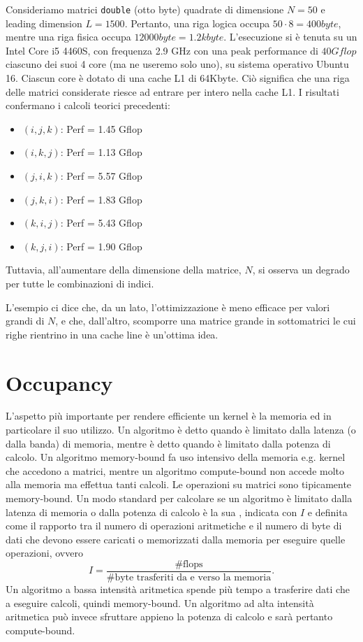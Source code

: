 \begin{example}{}
    Consideriamo matrici \texttt{double} (otto byte) quadrate di dimensione \(N = 50\) e leading dimension \(L = 1500\). 
    Pertanto, una riga logica occupa \(50 \cdot 8 = 400 byte\), mentre una riga fisica occupa \(12000 byte = 1.2 kbyte\).
    L'esecuzione si è tenuta su un Intel Core i5 4460S, con frequenza 2.9 GHz con una peak performance di \(40 Gflop\) ciascuno dei suoi 4 core (ma ne useremo solo uno), su sistema operativo Ubuntu 16.
    Ciascun core è dotato di una cache L1 di 64Kbyte.
    Ciò significa che una riga delle matrici considerate riesce ad entrare per intero nella cache L1.
    I risultati confermano i calcoli teorici precedenti:
    \begin{itemize}
        \item \((i,j,k)\): Perf = 1.45 Gflop
        \item \((i,k,j)\): Perf = 1.13 Gflop
        \item \((j,i,k)\): Perf = 5.57 Gflop
        \item \((j,k,i)\): Perf = 1.83 Gflop
        \item \((k,i,j)\): Perf = 5.43 Gflop
        \item \((k,j,i)\): Perf = 1.90 Gflop
    \end{itemize}
    Tuttavia, all'aumentare della dimensione della matrice, \(N\), si osserva un degrado per tutte le combinazioni di indici.

\end{example}
L'esempio ci dice che, da un lato, l'ottimizzazione è meno efficace per valori grandi di \(N\), e che, dall'altro, scomporre una matrice grande in sottomatrici le cui righe rientrino in una cache line è un'ottima idea.

\section{Occupancy}
L'aspetto più importante per rendere efficiente un kernel è la memoria ed in particolare il suo utilizzo.
Un algoritmo è detto  quando è limitato dalla latenza (o dalla banda) di memoria, mentre è detto  quando è limitato dalla potenza di calcolo.
Un algoritmo memory-bound fa uso intensivo della memoria e.g. kernel che accedono a matrici, mentre un algoritmo compute-bound non accede molto alla memoria ma effettua tanti calcoli.
Le operazioni su matrici sono tipicamente memory-bound.
Un modo standard per calcolare se un algoritmo è limitato dalla latenza di memoria o dalla potenza di calcolo è la sua , indicata con \(I\) e definita come il rapporto tra il numero di operazioni aritmetiche e il numero di byte di dati che devono essere caricati o memorizzati dalla memoria per eseguire quelle operazioni, ovvero 
\[I = \frac{\text{\#flops}}{\text{\#byte trasferiti da e verso la memoria}}.\]
Un algoritmo a bassa intensità aritmetica spende più tempo a trasferire dati che a eseguire calcoli, quindi memory-bound.
Un algoritmo ad alta intensità aritmetica può invece sfruttare appieno la potenza di calcolo e sarà pertanto compute-bound.

